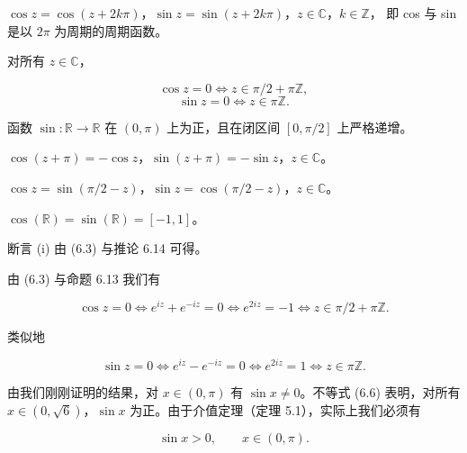 \begin{theorem}

\begin{subitems}
\item

$ \cos z = \cos(z + 2k\pi) $，$ \sin z = \sin(z + 2k\pi) $，$ z \in \mathbb{C} $，$ k \in \mathbb{Z} $，
即 cos 与 sin 是以 $ 2\pi $ 为周期的周期函数。

\item

对所有 $ z \in \mathbb{C} $，

\[
\cos z=0\Longleftrightarrow z\in\pi/2+\pi\mathbb{Z},
\]
\[
\sin z=0\Longleftrightarrow z\in\pi\mathbb{Z}.
\]
\item

函数 $ \sin: \mathbb{R} \to \mathbb{R} $ 在 $ (0, \pi) $ 上为正，且在闭区间 $ [0, \pi/2] $ 上严格递增。

\item

$ \cos(z + \pi) = -\cos z $，$ \sin(z + \pi) = -\sin z $，$ z \in \mathbb{C} $。

\item

$ \cos z = \sin(\pi/2 - z) $，$ \sin z = \cos(\pi/2 - z) $，$ z \in \mathbb{C} $。

\item

$ \cos(\mathbb{R}) = \sin(\mathbb{R}) = [-1, 1] $。

\proofhead
断言 (i) 由 (6.3) 与推论 6.14 可得。
\end{subitems}

\begin{subitems}
\item[（ii）]

由 (6.3) 与命题 6.13 我们有

\[
\cos z=0\Longleftrightarrow e^{i z}+e^{-i z}=0\Longleftrightarrow e^{2i z}=-1\Longleftrightarrow z\in\pi/2+\pi\mathbb{Z}.
\]

类似地

\[
\sin z=0\Longleftrightarrow e^{i z}-e^{-i z}=0\Longleftrightarrow e^{2i z}=1\Longleftrightarrow z\in\pi\mathbb{Z}.
\]
\item[（iii）]

由我们刚刚证明的结果，对 $ x \in (0, \pi) $ 有 $ \sin x \neq 0 $。不等式 (6.6) 表明，对所有 $ x \in (0, \sqrt{6}) $，$ \sin x $ 为正。由于介值定理（定理 5.1），实际上我们必须有

\begin{equation}
\sin x>0,\qquad x\in(0,\pi).
\end{equation}


\end{subitems}
\end{theorem}
